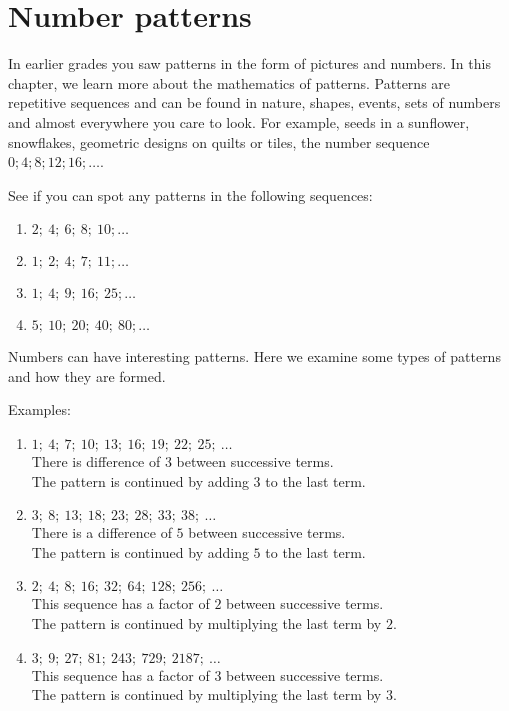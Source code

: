          \chapter{Number patterns}
    \setcounter{figure}{1}
    \setcounter{subfigure}{1}
            
In earlier grades you saw patterns in the form of pictures and numbers. In this chapter, we learn more about the mathematics of patterns. Patterns are repetitive sequences and can be found in nature, shapes, events, sets of numbers and almost everywhere you care to look. For example, seeds in a sunflower, snowflakes, geometric designs on quilts or tiles, the number sequence $0;4;8;12;16;\ldots$.\par 
See if you can spot any patterns in the following sequences: 
\begin{enumerate}[noitemsep, label=\textbf{\arabic*}. ] 
    \item $2;~4;~6;~8;~10;\ldots$
    \item $1;~2;~4;~7;~11;\ldots$
    \item $1;~4;~9;~16;~25;\ldots$
    \item $5;~10;~20;~40;~80;\ldots$
\end{enumerate}
Numbers can have interesting patterns. Here we examine some types of patterns and how they are formed.
\par
Examples:
\begin{enumerate}[noitemsep, label=\textbf{\arabic*}. ] 
    \item $1;~4;~7;~10;~13;~16;~19;~22;~25;~\ldots$\\
    There is difference of $3$ between successive terms.\\
    The pattern is continued by adding $3$ to the last term.
    \item $3;~8;~13;~18;~23;~28;~33;~38;~\ldots$\\
    There is a difference of $5$ between successive terms.\\
    The pattern is continued by adding $5$ to the last term.
    \item $2;~4;~8;~16;~32;~64;~128;~256;~\ldots$\\
    This sequence has a factor of $2$ between successive terms.\\
    The pattern is continued by multiplying the last term by $2$.
    \item $3;~9;~27;~81;~243;~729;~2187;~\ldots$\\
    This sequence has a factor of $3$ between successive terms.\\
    The pattern is continued by multiplying the last term by $3$.
\end{enumerate}
     

